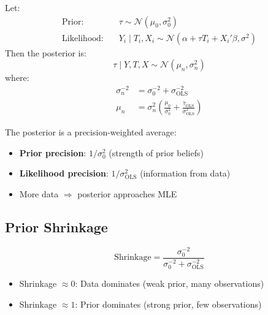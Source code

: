 \begin{proposition}
Let:
\begin{align}
\text{Prior:} \quad & \tau \sim \mathcal{N}(\mu_0, \sigma_0^2) \\
\text{Likelihood:} \quad & Y_i \mid T_i, X_i \sim \mathcal{N}(\alpha + \tau T_i + X_i'\beta, \sigma^2)
\end{align}
Then the posterior is:
\begin{equation}
\tau \mid Y, T, X \sim \mathcal{N}(\mu_n, \sigma_n^2)
\end{equation}
where:
\begin{align}
\sigma_n^{-2} &= \sigma_0^{-2} + \sigma_{\text{OLS}}^{-2} \label{eq:post-prec}\\
\mu_n &= \sigma_n^2 \left( \frac{\mu_0}{\sigma_0^2} + \frac{\hat{\tau}_{\text{OLS}}}{\sigma_{\text{OLS}}^2} \right) \label{eq:post-mean}
\end{align}
\end{proposition}

\begin{insight}
The posterior is a precision-weighted average:
\begin{itemize}
\item \textbf{Prior precision}: $1/\sigma_0^2$ (strength of prior beliefs)
\item \textbf{Likelihood precision}: $1/\sigma_{\text{OLS}}^2$ (information from data)
\item More data $\Rightarrow$ posterior approaches MLE
\end{itemize}
\end{insight}

\subsection{Prior Shrinkage}

\begin{definition}
\begin{equation}
\text{Shrinkage} = \frac{\sigma_0^{-2}}{\sigma_0^{-2} + \sigma_{\text{OLS}}^{-2}}
\end{equation}
\begin{itemize}
\item Shrinkage $\approx 0$: Data dominates (weak prior, many observations)
\item Shrinkage $\approx 1$: Prior dominates (strong prior, few observations)
\end{itemize}
\end{definition}

